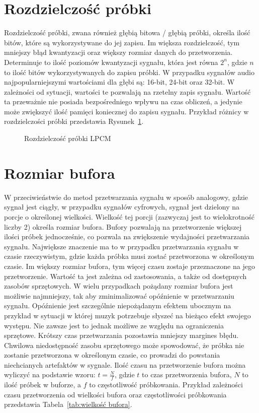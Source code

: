 \section{Rozdzielczość próbki}
Rozdzielczość próbki, zwana również głębią bitowa / głębią próbki, określa ilość bitów, które są wykorzystywane do jej zapisu. Im większa rozdzielczość, tym mniejszy błąd kwantyzacji oraz większy rozmiar danych do przetworzenia. Determinuje to ilość poziomów kwantyzacji sygnału, która jest równa $2^n$, gdzie $n$ to ilość bitów wykorzystywanych do zapisu próbki. W przypadku sygnałów audio najpopularniejszymi wartościami dla głębi są: 16-bit, 24-bit oraz 32-bit. W zależności od sytuacji, wartości te pozwalają na rzetelny zapis sygnału. Wartość ta przeważnie nie posiada bezpośredniego wpływu na czas obliczeń, a jedynie może zwiększyć ilość pamięci koniecznej do zapisu sygnału. Przykład różnicy w rozdzielczości próbki przedstawia Rysunek~\ref{fig:Rozdzielczość próbki LPCM}.
\begin{figure}
    \centering
    \scalebox{1.0}{}
    \caption{Rozdzielczość próbki LPCM}
    \label{fig:Rozdzielczość próbki LPCM}
\end{figure}


\section{Rozmiar bufora}
W przeciwieństwie do metod przetwarzania sygnału w sposób analogowy, gdzie sygnał jest ciągły, w przypadku sygnałów cyfrowych, sygnał jest dzielony na porcje o określonej wielkości. Wielkość tej porcji (zazwyczaj jest to wielokrotność liczby 2) określa rozmiar bufora. Bufory pozwalają na przetworzenie większej ilości próbek jednocześnie, co pozwala na zwiększenie wydajności przetwarzania sygnału. Największe znaczenie ma to w przypadku przetwarzania sygnału w czasie rzeczywistym, gdzie każda próbka musi zostać przetworzona w określonym czasie. Im większy rozmiar bufora, tym więcej czasu zostaje przeznaczone na jego przetworzenie. Wartość ta jest zależna od zastosowania, a także od dostępnych zasobów sprzętowych. W wielu przypadkach pożądany rozmiar bufora jest możliwie najmniejszy, tak aby zminimalizować opóźnienie w przetwarzaniu sygnału. Opóźnienie jest szczególnie niepożądanym efektem ubocznym na przykład w sytuacji w której muzyk potrzebuje słyszeć na bieżąco efekt swojego występu. Nie zawsze jest to jednak możliwe ze względu na ograniczenia sprzętowe. Krótszy czas przetwarzania pozostawia mniejszy margines błędu. Chwilowa niedostępność zasobu sprzętowego może spowodować, że próbka nie zostanie przetworzona w określonym czasie, co prowadzi do powstania niechcianych artefaktów w sygnale. Ilość czasu na przetworzenie bufora można wyliczyć na podstawie wzoru: $t = \frac{N}{f}$, gdzie $t$ to czas przetworzenia bufora, $N$ to ilość próbek w buforze, a $f$ to częstotliwość próbkowania. Przykład zależności czasu przetworzenia od wielkości bufora oraz częstotliwości próbkowania przedstawia Tabela~\ref{tab:wielkość bufora}.


